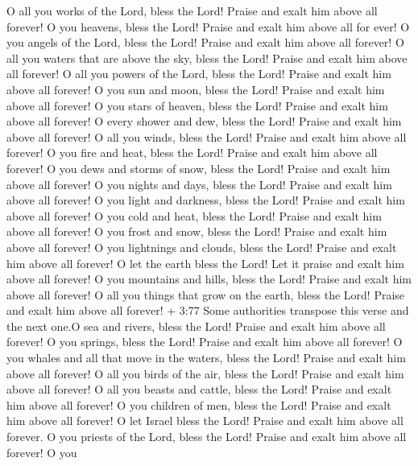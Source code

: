  O all you works of the Lord, bless the Lord! Praise and
exalt him above all forever!  O you heavens, bless the
Lord! Praise and exalt him above all for ever!  O you
angels of the Lord, bless the Lord! Praise and exalt him above all
forever!  O all you waters that are above the sky, bless
the Lord! Praise and exalt him above all forever!  O all
you powers of the Lord, bless the Lord! Praise and exalt him above all
forever!  O you sun and moon, bless the Lord! Praise and
exalt him above all forever!  O you stars of heaven, bless
the Lord! Praise and exalt him above all forever!  O every
shower and dew, bless the Lord! Praise and exalt him above all forever!
 O all you winds, bless the Lord! Praise and exalt him
above all forever!  O you fire and heat, bless the Lord!
Praise and exalt him above all forever!  O you dews and
storms of snow, bless the Lord! Praise and exalt him above all forever!
 O you nights and days, bless the Lord! Praise and exalt
him above all forever!  O you light and darkness, bless the
Lord! Praise and exalt him above all forever!  O you cold
and heat, bless the Lord! Praise and exalt him above all forever!
 O you frost and snow, bless the Lord! Praise and exalt him
above all forever!  O you lightnings and clouds, bless the
Lord! Praise and exalt him above all forever!  O let the
earth bless the Lord! Let it praise and exalt him above all forever!
 O you mountains and hills, bless the Lord! Praise and
exalt him above all forever!  O all you things that grow on
the earth, bless the Lord! Praise and exalt him above all forever!
 + 3:77 Some authorities transpose this verse and the next
one.O sea and rivers, bless the Lord! Praise and exalt him above all
forever!  O you springs, bless the Lord! Praise and exalt
him above all forever!  O you whales and all that move in
the waters, bless the Lord! Praise and exalt him above all forever!
 O all you birds of the air, bless the Lord! Praise and
exalt him above all forever!  O all you beasts and cattle,
bless the Lord! Praise and exalt him above all forever!  O
you children of men, bless the Lord! Praise and exalt him above all
forever!  O let Israel bless the Lord! Praise and exalt him
above all forever.  O you priests of the Lord, bless the
Lord! Praise and exalt him above all forever!  O you
